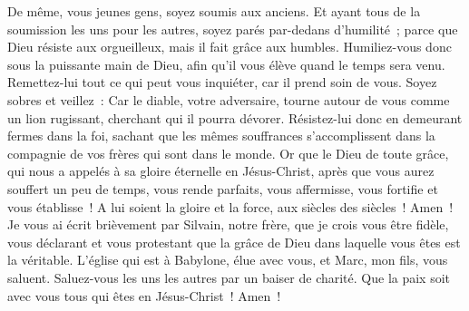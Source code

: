 \begin{multicols}{2}
De même, vous jeunes gens, soyez soumis aux anciens. Et ayant tous de la soumission les uns pour les autres, soyez parés par-dedans d'humilité~; parce que Dieu résiste aux orgueilleux, mais il fait grâce aux humbles. 
Humiliez-vous donc sous la puissante main de Dieu, afin qu'il vous élève quand le temps sera venu.
Remettez-lui tout ce qui peut vous inquiéter, car il prend soin de vous.
Soyez sobres et veillez~: Car le diable, votre adversaire, tourne autour de vous comme un lion rugissant, cherchant qui il pourra dévorer. 
Résistez-lui donc en demeurant fermes dans la foi, sachant que les mêmes souffrances s'accomplissent dans la compagnie de vos frères qui sont dans le monde. 
Or que le Dieu de toute grâce, qui nous a appelés à sa gloire éternelle en Jésus-Christ, après que vous aurez souffert un peu de temps, vous rende parfaits, vous affermisse, vous fortifie et vous établisse~! 
A lui soient la gloire et la force, aux siècles des siècles~! Amen~!
Je vous ai écrit brièvement par Silvain, notre frère, que je crois vous être fidèle, vous déclarant et vous protestant que la grâce de Dieu dans laquelle vous êtes est la véritable. 
L'église qui est à Babylone, élue avec vous, et Marc, mon fils, vous saluent. 
Saluez-vous les uns les autres par un baiser de charité. Que la paix soit avec vous tous qui êtes en Jésus-Christ~! Amen~!
\PPE{}
\end{multicols}
